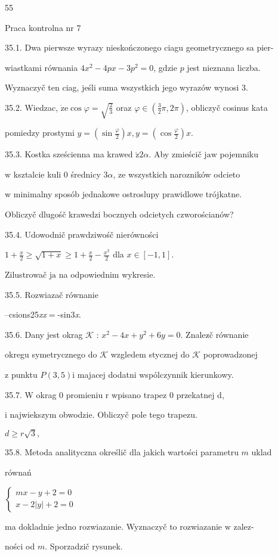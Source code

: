 \documentclass[a4paper,12pt]{article}
\begin{document}
55

Praca kontrolna nr 7

35.1. Dwa pierwsze wyrazy nieskończonego ciagu geometrycznego sa pier-

wiastkami równania $4x^{2}-4px-3p^{2}=0$, gdzie $p$ jest nieznana liczba.

Wyznaczyč ten ciag, jeśli suma wszystkich jego wyrazów wynosi 3.

35.2. Wiedzac, $\dot{\mathrm{z}}\mathrm{e} \cos\varphi=\sqrt{\frac{2}{3}}$ oraz $\varphi\in (\displaystyle \frac{3}{2}\pi,2\pi)$, obliczyč cosinus kata

pomiedzy prostymi $y= (\displaystyle \sin\frac{\varphi}{2})x, y= (\displaystyle \cos\frac{\varphi}{2})x.$

35.3. Kostka sześcienna ma krawed $\acute{\mathrm{z}}  2\alpha$. Aby zmieścič $\mathrm{j}\mathrm{a}\mathrm{w}$ pojemniku

$\mathrm{w}$ ksztalcie kuli $0$ średnicy $ 3\alpha$, ze wszystkich narozników odcieto

$\mathrm{w}$ minimalny sposób jednakowe ostroslupy prawidlowe trójkatne.

Obliczyč dlugośč krawedzi bocznych odcietych czworościanów?

35.4. Udowodnič prawdziwośč nierówności

$1+\displaystyle \frac{x}{2}\geq\sqrt{1+x}\geq 1+\frac{x}{2}-\frac{x^{2}}{2}$ dla $x\in[-1,1].$

Zilustrowač $\mathrm{j}\mathrm{a}$ na odpowiednim wykresie.

35.5. Rozwiazač równanie

--csions25{\it xx}$=$-sin3{\it x}.

35.6. Dany jest okrag $\mathcal{K}$ : $x^{2}-4x+y^{2}+6y = 0$. Znalez$\acute{}$č równanie

okregu symetrycznego do $\mathcal{K}$ wzgledem stycznej do $\mathcal{K}$ poprowadzonej

$\mathrm{z}$ punktu $P(3,5)\mathrm{i}$ majacej dodatni wspólczynnik kierunkowy.

35.7. W okrag 0 promieniu r wpisano trapez 0 przekatnej d,

i najwiekszym obwodzie. Obliczyč pole tego trapezu.

$ d\geq r\sqrt{3},$

35.8. Metoda analityczna określič dla jakich wartości parametru $m$ uklad

równań

$\left\{\begin{array}{l}
mx-y+2=0\\
x-2|y|+2=0
\end{array}\right.$

ma dokladnie jedno rozwiazanie. Wyznaczyč to rozwiazanie $\mathrm{w}$ zalez-

ności od $m$. Sporzadzič rysunek.
\end{document}

